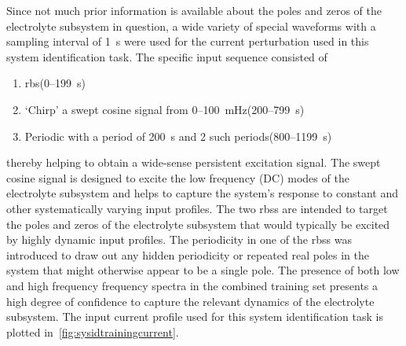 Since not much prior  information is available about the poles  and zeros of the
electrolyte subsystem  in question, a wide  variety of special waveforms  with a
sampling interval of \SI{1}{\second} were used for the current perturbation used
in this system identification task. The specific input sequence consisted of
\begin{enumerate}
    \item \gls{rbs}\quad (0--\SI{199}{\second})
    \item `Chirp' \ie{} a swept cosine signal from 0--\SI{100}{\milli\hertz}\quad (200--\SI{799}{\second})
    \item Periodic  with a period of \SI{200}{\second} and 2 such periods\quad (800--\SI{1199}{\second})
\end{enumerate}
thereby helping to  obtain a wide-sense persistent excitation  signal. The swept
cosine  signal  is designed  to  excite  the low  frequency  (DC)  modes of  the
electrolyte subsystem and helps to capture the system's response to constant and
other systematically varying input profiles. The two \glspl{rbs} are intended to
target the poles and zeros of  the electrolyte subsystem that would typically be
excited  by  highly dynamic  input  profiles.  The  periodicity  in one  of  the
\glspl{rbs} was introduced  to draw out any hidden periodicity  or repeated real
poles  in the  system that  might  otherwise appear  to  be a  single pole.  The
presence  of both  low  and high  frequency frequency  spectra  in the  combined
training  set presents  a  high degree  of confidence  to  capture the  relevant
dynamics of the  electrolyte subsystem. The input current profile  used for this
system identification task is plotted in~\cref{fig:sysidtrainingcurrent}.

